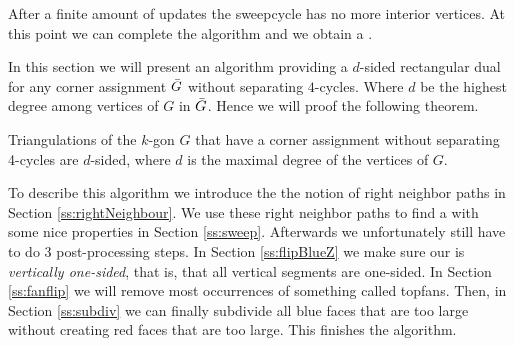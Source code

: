 After a finite amount of updates the sweepcycle has no more interior vertices. At this point we can complete the algorithm and we obtain a \rel.

In this section we will present an algorithm providing a $d$-sided rectangular dual for any corner assignment $\bar{G}$ without separating $4$-cycles. Where $d$ be the highest degree among vertices of $G$ in $\bar{G}$.  Hence we will proof the following theorem.

\begin{thrm}
\label{th:dsided}
Triangulations of the $k$-gon $G$ that have a corner assignment without separating 4-cycles are $d$-sided, where $d$ is the maximal degree of the vertices of $G$.
\end{thrm}

To describe this algorithm we introduce the the notion of right neighbor paths in Section \ref{ss:rightNeighbour}.  We use these right neighbor paths to find a \rel with some nice properties in Section \ref{ss:sweep}. Afterwards we unfortunately still have to do $3$ post-processing steps. In Section \ref{ss:flipBlueZ} we make sure our \rel is \emph{vertically one-sided}, that is, that all vertical segments are one-sided. In Section \ref{ss:fanflip} we will remove most occurrences of something called topfans. Then, in Section \ref{ss:subdiv} we can finally subdivide all blue faces that are too large without creating red faces that are too large. This finishes the algorithm.

